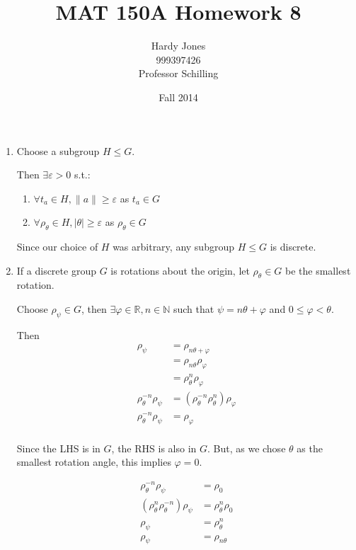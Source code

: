 \documentclass[12pt,letterpaper]{article}
\title{MAT 150A Homework 8\vspace{-2ex}}
\author{Hardy Jones\\
        999397426\\
        Professor Schilling\vspace{-2ex}}
\date{Fall 2014}
\newcommand{\abs}[1]{\lvert#1\rvert}
\newcommand{\norm}[1]{\lVert#1\rVert}
\begin{document}
  \maketitle

  \begin{enumerate}
    \item
      Choose a subgroup $H \le G$.

      Then $\exists \varepsilon > 0$ s.t.:
      \begin{enumerate}
        \item $\forall t_a \in H, \norm{a} \ge \varepsilon$ as $t_a \in G$
        \item $\forall \rho_\theta \in H, \abs{\theta} \ge \varepsilon$ as $\rho_\theta \in G$
      \end{enumerate}
      Since our choice of $H$ was arbitrary,
      any subgroup $H \le G$ is discrete.

    \item
      If a discrete group $G$ is rotations about the origin,
      let $\rho_\theta \in G$ be the smallest rotation.

      Choose $\rho_\psi \in G$,
      then $\exists \varphi \in \mathbb{R}, n \in \mathbb{N}$
      such that $\psi = n \theta + \varphi$ and $0 \le \varphi < \theta$.

      Then
      \begin{align*}
        \rho_\psi &= \rho_{n \theta + \varphi} \\
        &= \rho_{n \theta} \rho_\varphi \\
        &= \rho_\theta^n \rho_\varphi \\
        \rho_\theta^{-n} \rho_\psi &= (\rho_\theta^{-n} \rho_\theta^n) \rho_\varphi \\
        \rho_\theta^{-n} \rho_\psi &= \rho_\varphi \\
      \end{align*}

      Since the LHS is in $G$, the RHS is also in $G$.
      But, as we chose $\theta$ as the smallest rotation angle,
      this implies $\varphi = 0$.

      \begin{align*}
        \rho_\theta^{-n} \rho_\psi &= \rho_0 \\
        (\rho_\theta^{n} \rho_\theta^{-n}) \rho_\psi &= \rho_\theta^{n} \rho_0 \\
        \rho_\psi &= \rho_\theta^{n} \\
        \rho_\psi &= \rho_{n\theta} \\
      \end{align*}


\end{enumerate}
\end{document}
